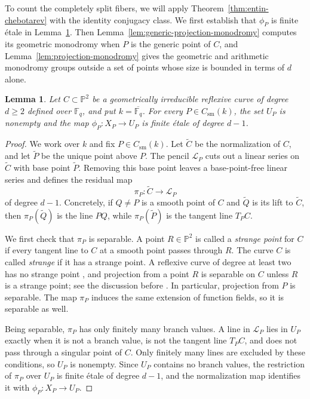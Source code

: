 \documentclass[10pt,a4paper]{amsart}
\newtheorem{lemma}[theorem]{Lemma}
\theoremstyle{definition}
\theoremstyle{remark}
\newcommand{\Fq}{\mathbb{F}_q}
\newcommand{\bP}{\mathbb{P}}
\begin{document}
To count the completely split fibers, we will apply Theorem~\ref{thm:entin-chebotarev} with the identity conjugacy class. We first establish that $\phi_P$ is finite \'etale in Lemma~\ref{lem:incidence-cover}. Then Lemma~\ref{lem:generic-projection-monodromy} computes its geometric monodromy when $P$ is the generic point of $C$, and Lemma~\ref{lem:projection-monodromy} gives the geometric and arithmetic monodromy groups outside a set of points whose size is bounded in terms of $d$ alone.

\begin{lemma}\label{lem:incidence-cover}
Let $C\subset\bP^2$ be a geometrically irreducible reflexive curve of degree $d\geq2$ defined over $\Fq$, and put $k=\overline{\Fq}$. For every $P\in C_{\mathrm{sm}}(k)$, the set $U_P$ is nonempty and the map $\phi_P\colon X_P\to U_P$ is finite \'etale of degree $d-1$.
\end{lemma}

\begin{proof}
We work over $k$ and fix $P\in C_{\mathrm{sm}}(k)$. Let $\widetilde C$ be the normalization of $C$, and let $\widetilde P$ be the unique point above $P$. The pencil $\mathcal L_P$ cuts out a linear series on $\widetilde C$ with base point $\widetilde P$. Removing this base point leaves a base-point-free linear series and defines the residual map
\[
\pi_P\colon\widetilde C\longrightarrow\mathcal L_P
\]
of degree $d-1$. Concretely, if $Q\neq P$ is a smooth point of $C$ and $\widetilde Q$ is its lift to $\widetilde C$, then $\pi_P(\widetilde Q)$ is the line $PQ$, while $\pi_P(\widetilde P)$ is the tangent line $T_PC$.

We first check that $\pi_P$ is separable. A point $R\in\bP^2$ is called a \emph{strange point} for $C$ if every tangent line to $C$ at a smooth point passes through $R$. The curve $C$ is called \emph{strange} if it has a strange point. A reflexive curve of degree at least two has no strange point \cite[p.~4]{Hef89}, and projection from a point $R$ is separable on $C$ unless $R$ is a strange point; see the discussion before \cite[Lemma~2.2]{Ent21}. In particular, projection from $P$ is separable. The map $\pi_P$ induces the same extension of function fields, so it is separable as well.

Being separable, $\pi_P$ has only finitely many branch values. A line in $\mathcal L_P$ lies in $U_P$ exactly when it is not a branch value, is not the tangent line $T_PC$, and does not pass through a singular point of $C$. Only finitely many lines are excluded by these conditions, so $U_P$ is nonempty. Since $U_P$ contains no branch values, the restriction of $\pi_P$ over $U_P$ is finite \'etale of degree $d-1$, and the normalization map identifies it with $\phi_P\colon X_P\to U_P$.
\end{proof}
\end{document}
